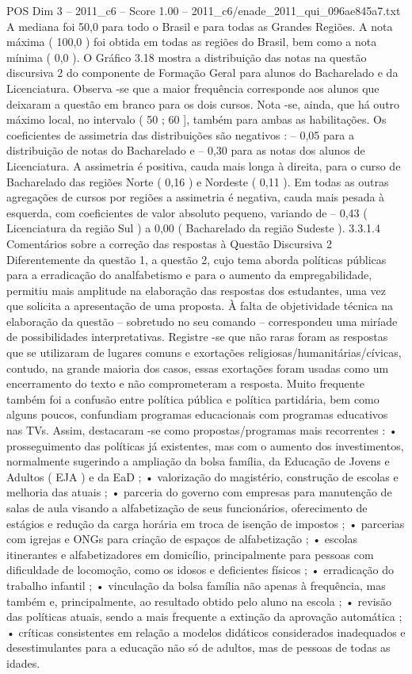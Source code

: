 \begin{textsample}{POS Dim 3 – 2011\_c6 – Score 1.00 – 2011\_c6/enade\_2011\_qui\_096ae845a7.txt}
A mediana foi 50,0 para todo o Brasil e para todas as Grandes Regiões.
A nota máxima ( 100,0 ) foi obtida em todas as regiões do Brasil, bem como a nota mínima ( 0,0 ).
O Gráfico 3.18 mostra a distribuição das notas na questão discursiva 2 do componente de Formação Geral para alunos do Bacharelado e da Licenciatura.
Observa -se que a maior frequência corresponde aos alunos que deixaram a questão em branco para os dois cursos.
Nota -se, ainda, que há outro máximo local, no intervalo ( 50 ; 60 ], também para ambas as habilitações.
Os coeficientes de assimetria das distribuições são negativos : – 0,05 para a distribuição de notas do Bacharelado e – 0,30 para as notas dos alunos de Licenciatura.
A assimetria é positiva, cauda mais longa à direita, para o curso de Bacharelado das regiões Norte ( 0,16 ) e Nordeste ( 0,11 ).
Em todas as outras agregações de cursos por regiões a assimetria é negativa, cauda mais pesada à esquerda, com coeficientes de valor absoluto pequeno, variando de – 0,43 ( Licenciatura da região Sul ) a 0,00 ( Bacharelado da região Sudeste ). 3.3.1.4 Comentários sobre a correção das respostas à Questão Discursiva 2 Diferentemente da questão 1, a questão 2, cujo tema aborda políticas públicas para a erradicação do analfabetismo e para o aumento da empregabilidade, permitiu mais amplitude na elaboração das respostas dos estudantes, uma vez que solicita a apresentação de uma proposta.
À falta de objetividade técnica na elaboração da questão – sobretudo no seu comando – correspondeu uma miríade de possibilidades interpretativas.
Registre -se que não raras foram as respostas que se utilizaram de lugares comuns e exortações religiosas/humanitárias/cívicas, contudo, na grande maioria dos casos, essas exortações foram usadas como um encerramento do texto e não comprometeram a resposta.
Muito frequente também foi a confusão entre política pública e política partidária, bem como alguns poucos, confundiam programas educacionais com programas educativos nas TVs.
Assim, destacaram -se como propostas/programas mais recorrentes : • prosseguimento das políticas já existentes, mas com o aumento dos investimentos, normalmente sugerindo a ampliação da bolsa família, da Educação de Jovens e Adultos ( EJA ) e da EaD ; • valorização do magistério, construção de escolas e melhoria das atuais ; • parceria do governo com empresas para manutenção de salas de aula visando a alfabetização de seus funcionários, oferecimento de estágios e redução da carga horária em troca de isenção de impostos ; • parcerias com igrejas e ONGs para criação de espaços de alfabetização ; • escolas itinerantes e alfabetizadores em domicílio, principalmente para pessoas com dificuldade de locomoção, como os idosos e deficientes físicos ; • erradicação do trabalho infantil ; • vinculação da bolsa família não apenas à frequência, mas também e, principalmente, ao resultado obtido pelo aluno na escola ; • revisão das políticas atuais, sendo a mais frequente a extinção da aprovação automática ; • críticas consistentes em relação a modelos didáticos considerados inadequados e desestimulantes para a educação não só de adultos, mas de pessoas de todas as idades.

\end{textsample}
